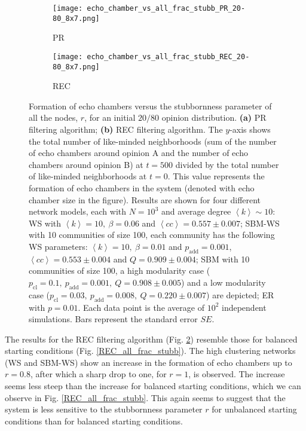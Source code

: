 \documentclass[11 pt , letterpaper , twoside , openright]{book}
\begin{document}
\begin{figure}[H]
  \begin{subfigure}[b]{0.49\textwidth}
    \caption{PR}
  	\texttt{[image: echo\_chamber\_vs\_all\_frac\_stubb\_PR\_20-80\_8x7.png]}
    \label{PR_all_frac_stubb_20-80}
  \end{subfigure}
  \begin{subfigure}[b]{0.49\textwidth}
    \caption{REC}
  	\texttt{[image: echo\_chamber\_vs\_all\_frac\_stubb\_REC\_20-80\_8x7.png]}
    \label{REC_all_frac_stubb_20-80}
  \end{subfigure}
  \captionsetup{format=plain}
  \caption[Formation of echo chambers versus the stubbornness parameter of all the nodes, $r$, for the PR and REC filtering algorithms and an initial $20/80$ opinion distribution.]{Formation of echo chambers versus the stubbornness parameter of all the nodes, $r$, for an initial $20/80$ opinion distribution. \textbf{(a)} PR filtering algorithm; \textbf{(b)} REC filtering algorithm. The $y$-axis shows the total number of like-minded neighborhoods (sum of the number of echo chambers around opinion A and the number of echo chambers around opinion B) at $t=500$ divided by the total number of like-minded neighborhoods at $t=0$. This value represents the formation of echo chambers in the system (denoted with echo chamber size in the figure). Results are shown for four different network models, each with $N=10^3$ and average degree $\left<k\right> \sim 10$: WS with $\left<k\right> =10,\ \beta = 0.06$ and $\left<cc\right> = 0.557 \pm 0.007$; SBM-WS with 10 communities of size 100, each community has the following WS parameters: $\left<k\right> = 10,\ \beta = 0.01$ and $p_{\text{add}} = 0.001$, $\left<cc\right> = 0.553 \pm 0.004$ and $Q = 0.909 \pm 0.004$; SBM with 10 communities of size 100, a high modularity case ($p_{\text{cl}} = 0.1,\ p_{\text{add}} = 0.001,\ Q = 0.908 \pm 0.005$) and a low modularity case ($p_{\text{cl}} = 0.03,\ p_{\text{add}} = 0.008,\ Q = 0.220 \pm 0.007$) are depicted; ER with $p= 0.01$. Each data point is the average of $10^2$ independent simulations. Bars represent the standard error $SE$.}
\label{echo_vs_all_frac_stubb_PR-REC_20-80}
\end{figure}
\noindent
The results for the REC filtering algorithm (Fig. \ref{REC_all_frac_stubb_20-80}) resemble those for balanced starting conditions (Fig. \ref{REC_all_frac_stubb}). The high clustering networks (WS and SBM-WS) show an increase in the formation of echo chambers up to $r=0.8$, after which a sharp drop to one, for $r=1$, is observed. The increase seems less steep than the increase for balanced starting conditions, which we can observe in Fig. \ref{REC_all_frac_stubb}. This again seems to suggest that the system is less sensitive to the stubbornness parameter $r$ for unbalanced starting conditions than for balanced starting conditions.\\
\end{document}
